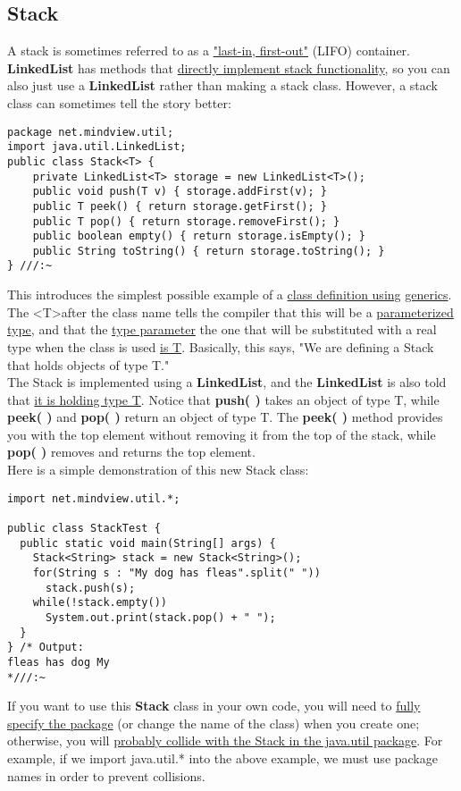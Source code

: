 \documentclass[10pt,letterpaper]{report}
\begin{document}
\subsection{Stack}
A stack is sometimes referred to as a \underline{"last-in, first-out"} (LIFO) container. \textbf{LinkedList} has methods that \underline{directly implement stack functionality}, so you can also just use a \textbf{LinkedList} rather than making a stack class. However, a stack class can sometimes tell the story better:
\begin{lstlisting}
package net.mindview.util;
import java.util.LinkedList;
public class Stack<T> {
	private LinkedList<T> storage = new LinkedList<T>();
	public void push(T v) { storage.addFirst(v); }
	public T peek() { return storage.getFirst(); }
	public T pop() { return storage.removeFirst(); }
	public boolean empty() { return storage.isEmpty(); }
	public String toString() { return storage.toString(); }
} ///:~
\end{lstlisting}

This introduces the simplest possible example of a \underline{class definition using} \underline{generics}. The \textless T\textgreater after the class name tells the compiler that this will be a \underline{parameterized type}, and that the \underline{type parameter} \textendash the one that will be substituted with a real type when the class is used \textendash \underline{is T}. Basically, this says, "We are defining a Stack that holds objects of type T."\\ The Stack is implemented using a \textbf{LinkedList}, and the \textbf{LinkedList} is also told that \underline{it is holding type T}. Notice that \textbf{push( )} takes an object of type T, while \textbf{peek( )} and \textbf{pop( )} return an object of type T. The \textbf{peek( )} method provides you with the top element without removing it from the top of the stack, while \textbf{pop( )} removes and returns the top element.\\
Here is a simple demonstration of this new Stack class:
\begin{lstlisting}
import net.mindview.util.*;

public class StackTest {
  public static void main(String[] args) {
    Stack<String> stack = new Stack<String>();
    for(String s : "My dog has fleas".split(" "))
      stack.push(s);
    while(!stack.empty())
      System.out.print(stack.pop() + " ");
  }
} /* Output:
fleas has dog My
*///:~
\end{lstlisting}
If you want to use this \textbf{Stack} class in your own code, you will need to \underline{fully} \underline{specify the package} (or change the name of the class) when you create one; otherwise, you will \underline{probably collide with the Stack in the java.util package}. For example, if we import java.util.* into the above example, we must use package names in order to prevent collisions.
\end{document}
